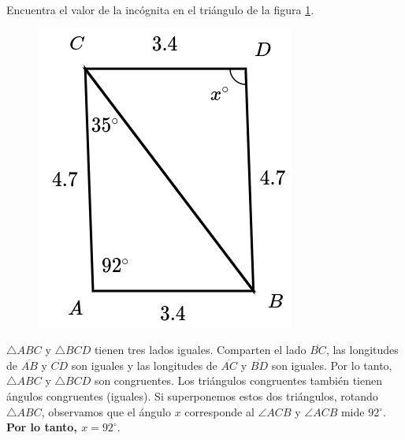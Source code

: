 Encuentra el valor de la incógnita en el triángulo de la figura \ref{fig:angle_triangle_04}.

\begin{minipage}[t][][t]{0.3\textwidth}
    \begin{figure}[H]
        \centering
        \includegraphics[width=0.7\linewidth]{../images/angle_triangle_04.png}
        \caption{}
        \label{fig:angle_triangle_04}
    \end{figure}
\end{minipage}\hfill
\begin{minipage}[t][][t]{0.65\textwidth}
    \begin{solutionbox}{4cm}
        $\triangle ABC$ y $\triangle BCD$ tienen tres lados iguales. Comparten el lado
        $\overline{BC}$, las longitudes de $\overline{AB}$ y $\overline{CD}$ son iguales y las longitudes de
        $\overline{AC}$ y $\overline{BD}$ son iguales. Por lo tanto,
        $\triangle ABC$ y $\triangle BCD$  son congruentes.
        Los triángulos congruentes también tienen ángulos congruentes (iguales). Si superponemos estos dos triángulos, rotando
        $\triangle ABC$, observamos que el ángulo $x$ corresponde al
        $\angle ACB$ y $\angle ACB$ mide
        92$^\circ$.
        \textbf{Por lo tanto, $x=92^\circ$}.
    \end{solutionbox}
\end{minipage}
